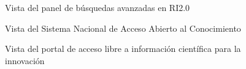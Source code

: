 \begin{figure}[!ht]
    \centering
    \caption{Vista del panel de b\'usquedas avanzadas en RI2.0} %
    \label{ri2.0-3}
\end{figure}

\begin{figure}[!ht]
    \centering
    \caption{Vista del Sistema Nacional de Acceso Abierto al Conocimiento} %
    \label{snaac-1}
\end{figure}

\begin{figure}[!ht]
    \centering
    \caption{Vista del portal de acceso libre a informaci\'on cient\'ifica para la innovaci\'on} %
    \label{alicia-1}
\end{figure}

